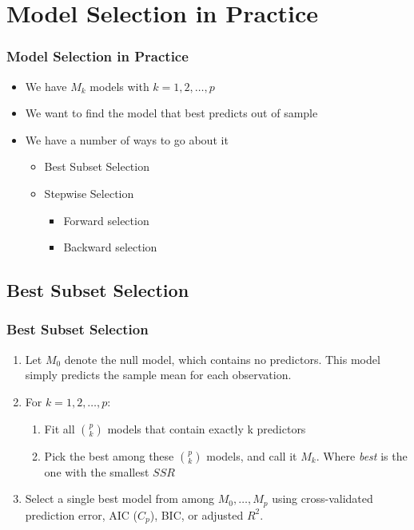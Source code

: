 \documentclass[
  shownotes,
  xcolor={svgnames},
  hyperref={colorlinks,citecolor=DarkBlue,linkcolor=DarkRed,urlcolor=DarkBlue}
  ]{beamer}
\begin{document}
\section{Model Selection in Practice}
\begin{frame}[fragile]
\frametitle{Model Selection in Practice}

\begin{itemize}
\item We have $M_k$ models with $k=1,2,\dots,p$
\bigskip
\item We want to find the model that best predicts out of sample
\bigskip
\item We have a number of ways to go about it
\bigskip
\begin{itemize}
  \item Best Subset Selection
  \medskip
  \item Stepwise Selection
  \begin{itemize}
    \item Forward selection
    \medskip
    \item Backward selection
  \end{itemize}
\end{itemize}
\end{itemize}
\end{frame}
\subsection{Best Subset Selection}
\begin{frame}[fragile]
\frametitle{Best Subset Selection}
\begin{enumerate}
\item Let $M_0$ denote the null model, which contains no predictors. This model simply predicts the sample mean for each observation.
\bigskip
\item  For $k=1,2,\dots,p$:
\medskip
\begin{enumerate}
 \item Fit all $\binom{p}{k}$ models that contain exactly k predictors
 \medskip
 \item Pick the best among these $\binom{p}{k}$ models, and call it $M_k$. Where {\it best} is the one with the smallest $SSR$
\end{enumerate}
\bigskip
\item  Select a single best model from among $M_0,\dots, M_p$ using cross-validated prediction error, AIC ($C_p$), BIC, or adjusted $R^2$.
\end{enumerate}
 
 \end{frame}
\end{document}
